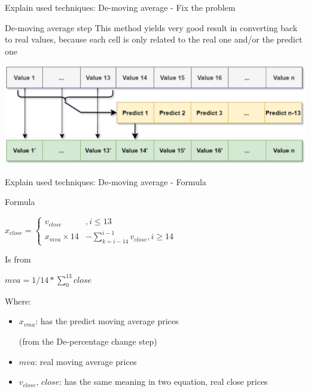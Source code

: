 \documentclass[compress, mathserif, fleqn, 10pt]{beamer}
\begin{document}
	\begin{frame}{Explain used techniques: De-moving average - Fix the problem}
		\begin{block}{De-moving average step}
			This method yields very good result in converting back to real values, because each cell is only related to the real one and/or the predict one
		\end{block}
		\smallskip
		\centerline{\includegraphics[width=\textwidth]{images/dec_moving.eps}}
		\bigskip
	\end{frame}
	
	\begin{frame}{Explain used techniques: De-moving average - Formula}
		\begin{block}{Formula}
			\centerline{$
				x_{close}=
				\begin{cases}
					v_{close}        & , i \leq 13                               \\
					x_{mva}\times 14 & - \sum_{k=i-14}^{i-1}v_{close}, i \geq 14
				\end{cases}
				$}
			
			\smallskip
			
			\centerline{Is from}
			
			\smallskip
			
			\centerline{$mva=1/14 * \sum_{0}^{13}close$}
			
			\smallskip
			Where:
			
			\begin{itemize}
				\item $x_{vma}$: has the predict moving average prices 
				
					(from the De-percentage change step)
					
				\item $mva$: real moving average prices
				\item $v_{close}$, $close$: has the same meaning in two equation, real close prices
			\end{itemize}
			
		\end{block}
	\end{frame}
\end{document}
